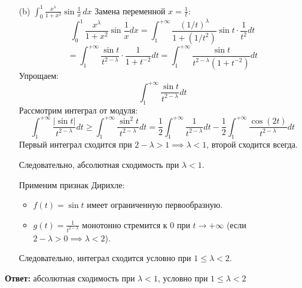 \documentclass[a4paper]{article}
\renewcommand{\geq}{\geqslant}
\renewcommand{\leq}{\leqslant}
\begin{document}
\begin{enumerate}
\begin{enumerate}
    \item[(b)]\(\int_{0}^{1} \frac{x^{\lambda}}{1+x^2} \sin \frac{1}{x} \, dx\)
    Замена переменной \(x = \frac{1}{t}\):
    \[
    \int_{0}^{1} \frac{x^{\lambda}}{1+x^2} \sin \frac{1}{x} dx =
     \int_{1}^{+\infty} \frac{(1/t)^{\lambda}}{1 + (1/t^2)} \sin t 
     \cdot \frac{1}{t^2} dt
     \]
    \[ = \int_{1}^{+\infty} \frac{\sin t}{t^{2 - \lambda}} \cdot \frac{1}{1 + t^{-2}} dt
     = \int_{1}^{+\infty} \frac{\sin t}{t^{2 - \lambda}(1 + t^{-2})} dt
    \]  
    Упрощаем:  
    \[
    \int_{1}^{+\infty} \frac{\sin t}{t^{2 - \lambda}} dt
    \]
    Рассмотрим интеграл от модуля:  
    \[
    \int_{1}^{+\infty} \frac{|\sin t|}{t^{2 - \lambda}} 
    dt \geq \int_{1}^{+\infty} \frac{\sin^2 t}{t^{2 - \lambda}} dt 
    = \frac{1}{2} \int_{1}^{+\infty} \frac{1}{t^{2 - \lambda}} dt 
    - \frac{1}{2} \int_{1}^{+\infty} \frac{\cos(2t)}{t^{2 - \lambda}} dt
    \]  
    Первый интеграл сходится при \(2 - \lambda > 1 \implies \lambda < 1\), второй сходится всегда.  
    
    Следовательно, абсолютная сходимость при \(\lambda < 1\).

    Применим признак Дирихле:
    \begin{itemize}
      \item \(f(t) = \sin t\) имеет ограниченную первообразную.
      \item \(g(t) = \frac{1}{t^{2 - \lambda}}\) 
      монотонно стремится к 0 при \(t \to +\infty\)
       (если \(2 - \lambda > 0 \implies \lambda < 2\)).  
    \end{itemize}

    Следовательно, интеграл сходится условно при \(1 \leq \lambda < 2\).
  \end{enumerate}
  \textbf{Ответ: }абсолютная сходимость при \(\lambda < 1\), условно при \(1 \leq \lambda < 2\)
  
\end{enumerate}
\end{document}

